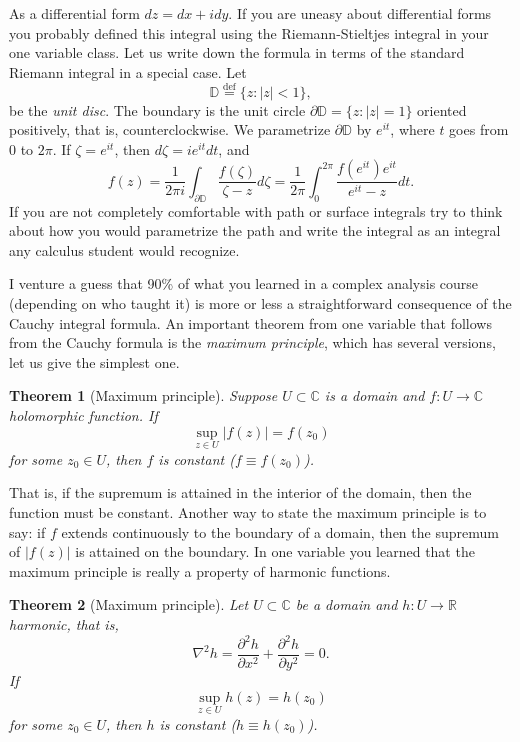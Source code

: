 \documentclass[12pt,openany]{book}
\newcommand{\sabs}[1]{\lvert {#1} \rvert}
\newcommand{\C}{{\mathbb{C}}}
\newcommand{\R}{{\mathbb{R}}}
\newcommand{\D}{{\mathbb{D}}}
\newcommand{\myindex}[1]{#1\index{#1}}
\theoremstyle{plain}
\newtheorem{thm}{Theorem}[section]
\theoremstyle{remark}
\theoremstyle{definition}
\theoremstyle{exercise}
\theoremstyle{example}
\begin{document}
As a differential form $dz = dx + i dy$.  If you are uneasy
about differential forms you probably defined this integral using
the Riemann-Stieltjes integral in your one variable class.
Let us write down the formula in terms of the standard Riemann integral
in a special case.  Let
\begin{equation*}
\D
\overset{\text{def}}{=}
\{ z : \sabs{z} < 1 \} ,
\end{equation*}
be the \emph{\myindex{unit disc}}.  The boundary is the unit circle
$\partial \D = \{ z : \sabs{z} = 1 \}$ oriented positively, that is, counterclockwise.   We parametrize $\partial \D$
by $e^{it}$, where $t$ goes from 0 to $2\pi$.  If $\zeta = e^{it}$,
then $d\zeta = ie^{it}dt$, and
\begin{equation*}
f(z) =
\frac{1}{2\pi i}
\int_{\partial \D}
\frac{f(\zeta)}{\zeta-z}
d \zeta 
=
\frac{1}{2\pi}
\int_0^{2\pi}
\frac{f(e^{it}) e^{it} }{e^{it}-z}
dt .
\end{equation*}
If you are not completely comfortable
with
path or surface integrals try to think about how you would parametrize the path and
write the integral as an integral any calculus student would recognize.

I venture a guess that 90\% of what you learned in a complex analysis
course (depending on who taught it)
is more or less a straightforward consequence of the Cauchy
integral formula.
An important theorem from one variable that follows from
the Cauchy formula is the \emph{\myindex{maximum principle}},
which has several versions, let us give the simplest one.

\begin{thm}[Maximum principle]
Suppose $U \subset \C$ is a domain and $f \colon U \to \C$
holomorphic function.
If
\begin{equation*}
\sup_{z \in U} \sabs{f(z)} = f(z_0)
\end{equation*}
for some $z_0 \in U$, then $f$ is constant ($f \equiv f(z_0)$).
\end{thm}

That is, if the supremum is attained in the interior of the domain,
then the function must be constant.  Another way to state the maximum
principle is to say: if $f$ extends continuously to the boundary of a
domain, then the supremum of $\sabs{f(z)}$ is attained on the boundary.
In
one variable you learned that the maximum principle is really a
property of harmonic functions.

\begin{thm}[Maximum principle]
Let $U \subset \C$ be a domain and $h \colon U \to \R$
harmonic, that is,
\begin{equation*}
\nabla^2 h = \frac{\partial^2 h}{\partial x^2} + \frac{\partial^2 h}{\partial
y^2} = 0 .
\end{equation*}
If
\begin{equation*}
\sup_{z \in U} h(z) = h(z_0)
\end{equation*}
for some $z_0 \in U$, then $h$ is constant ($h \equiv h(z_0)$).
\end{thm}
\end{document}
